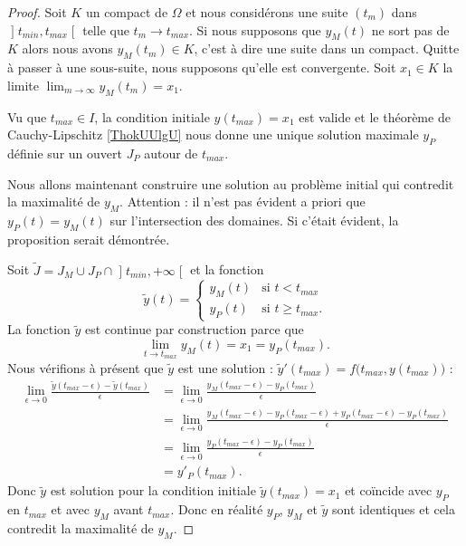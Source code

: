 \begin{proof}
Soit \( K\) un compact de \( \Omega\) et nous considérons une suite \( (t_m)\) dans \( \mathopen] t_{min} , t_{max} \mathclose[\) telle que \( t_m\to t_{max}\). Si nous supposons que \( y_M(t)\) ne sort pas de \( K\) alors nous avons \( y_M(t_m)\in K\), c'est à dire une suite dans un compact. Quitte à passer à une sous-suite, nous supposons qu'elle est convergente. Soit \( x_1\in K\) la limite \( \lim_{m\to \infty}y_M(t_m)=x_1\).

    Vu que \( t_{max}\in I\), la condition initiale \( y(t_{max})=x_1\) est valide et le théorème de Cauchy-Lipschitz \ref{ThokUUlgU} nous donne une unique solution maximale \( y_P\) définie sur un ouvert \( J_P\) autour de \( t_{max}\).

    Nous allons maintenant construire une solution au problème initial qui contredit la maximalité de \( y_M\). Attention : il n'est pas évident a priori que \( y_P(t)=y_M(t)\) sur l'intersection des domaines. Si c'était évident, la proposition serait démontrée.

    Soit \( \tilde J=J_M\cup J_P\cap\mathopen] t_{min} , +\infty \mathclose[\) et la fonction
        \begin{equation}
            \tilde y(t)=\begin{cases}
                y_M(t)    &   \text{si } t<t_{max}\\
                y_P(t)    &    \text{si } t\geq t_{max}.
            \end{cases}
        \end{equation}
        La fonction \( \tilde y\) est continue par construction parce que
        \begin{equation}
            \lim_{t\to t_{max}} y_M(t)=x_1=y_P(t_{max}).
        \end{equation}
        Nous vérifions à présent que \( \tilde y\) est une solution : \( \tilde y'(t_{max})=f\big( t_{max},y(t_{max}) \big)\) :
        \begin{subequations}
            \begin{align}
                \lim_{\epsilon\to 0}\frac{ \tilde y(t_{max}-\epsilon)-\tilde y(t_{max}) }{ \epsilon }&=\lim_{\epsilon\to 0}\frac{ y_M(t_{max}-\epsilon)-y_P(t_{max}) }{ \epsilon }\\
                &=\lim_{\epsilon\to 0}\frac{ y_M(t_{max}-\epsilon)-y_P(t_{max}-\epsilon)+y_P(t_{max}-\epsilon)-y_P(t_{max}) }{ \epsilon }\\
                &=\lim_{\epsilon\to 0}\frac{ y_P(t_{max}-\epsilon)-y_P(t_{max}) }{ \epsilon }\\
                &=y'_P(t_{max}).
            \end{align}
        \end{subequations}
        Donc \( \tilde y\) est solution pour la condition initiale \( \tilde y(t_{max})=x_1\) et coïncide avec \( y_P\) en \( t_{max}\) et avec \( y_M\) avant \( t_{max}\). Donc en réalité \( y_P\), \( y_M\) et \( \tilde y\) sont identiques et cela contredit la maximalité de \( y_M\).
\end{proof}

